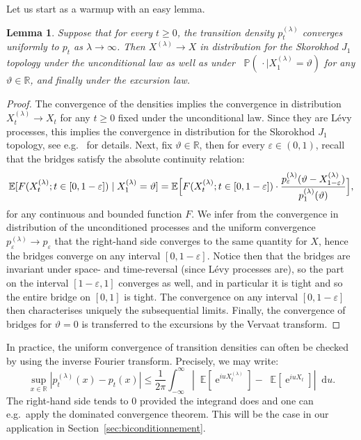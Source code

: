 \documentclass[british, a4paper,11pt]{article}
\numberwithin{equation}{section}
\newtheorem{lem}[thm]{Lemma}
\theoremstyle{definition}
\renewcommand{\P}{\mathop{}\!\mathbb{P}}
\newcommand{\E}{\mathop{}\!\mathbb{E}}
\newcommand{\R}{\mathbb{R}}
\newcommand{\e}{\operatorname{e}}
\renewcommand{\d}{\mathop{}\!\mathrm{d}}
\begin{document}
Let us start as a warmup with an easy lemma. 



\begin{lem}\label{lem:cv_densite_excursion}
Suppose that for every $t \geq 0$, the transition density $p^{(\lambda)}_t$ converges uniformly to $p_t$ as $\lambda \to \infty$.
Then $X^{(\lambda)} \to X$ in distribution for the Skorokhod $J_{1}$ topology under the unconditional law as well as under $\P(\,\cdot\mid X^{(\lambda)}_1=\vartheta)$ for any $\vartheta \in \R$, and finally under the excursion law.
\end{lem}

\begin{proof}
The convergence of the densities implies the convergence in distribution $X^{(\lambda)}_t \to X_t$ for any $t \geq 0$ fixed under the unconditional law. Since they are L\'evy processes, this implies the convergence in distribution for the Skorokhod $J_{1}$ topology, see e.g.~\cite[Chapter~VII]{JS03} for details. Next, fix $\vartheta \in \R$, then for every $\varepsilon \in (0,1)$, recall that the bridges satisfy the absolute continuity relation:
\[\E[F(X^{(\lambda)}_t ; t \in [0, 1-\varepsilon]) \mid X^{(\lambda)}_1=\vartheta]
= \E\Bigl[F(X^{(\lambda)}_t ; t \in [0, 1-\varepsilon]) \cdot \frac{p^{(\lambda)}_{\varepsilon}(\vartheta-X^{(\lambda)}_{1-\varepsilon})}{p^{(\lambda)}_1(\vartheta)}\Bigr]
,\]
for any continuous and bounded function $F$. We infer from the convergence in distribution of the unconditioned processes and the uniform convergence $p^{(\lambda)}_{\varepsilon} \to p_{\varepsilon}$ that the right-hand side converges to the same quantity for $X$, hence the bridges converge on any interval $[0, 1-\varepsilon]$. Notice then that the bridges are invariant under space- and time-reversal (since L\'evy processes are), so the part on the interval $[1-\varepsilon, 1]$ converges as well, 
and in particular it is tight and so the entire bridge on $[0,1]$ is tight.
The convergence on any interval $[0, 1-\varepsilon]$ then characterises uniquely the subsequential limits.
Finally, the convergence of bridges for $\vartheta=0$ is transferred to the excursions by the Vervaat transform.
\end{proof}



In practice, the uniform convergence of transition densities can  often be checked by using the inverse Fourier transform. Precisely, we may write:
\[
\sup_{x \in \R} |p^{(\lambda)}_t(x) - p_t(x)| 
\leq \frac{1}{2\pi} \int_{-\infty}^\infty |\E[\e^{i u X^{(\lambda)}_t}] - \E[\e^{i u X_t}]| \d u
.\]
The right-hand side tends to $0$ provided the integrand does and one can e.g.~apply the dominated convergence theorem.
This will be the case in our application in Section~\ref{sec:biconditionnement}.
\end{document}
